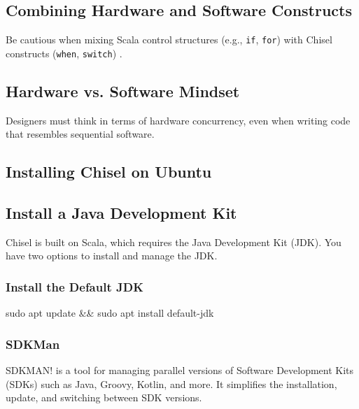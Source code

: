 \subsection{Combining Hardware and Software Constructs}
Be cautious when mixing Scala control structures (e.g., \texttt{if}, \texttt{for}) with Chisel constructs (\texttt{when}, \texttt{switch}) \cite{chisel-tutorial}.

\subsection{Hardware vs. Software Mindset}
Designers must think in terms of hardware concurrency, even when writing code that resembles sequential software.

\subsection{Installing Chisel on Ubuntu}
\subsection{Install a Java Development Kit}
Chisel is built on Scala, which requires the Java Development Kit (JDK). You have two options to install and manage the JDK.

\subsubsection{Install the Default JDK}
\begin{bashcode}
sudo apt update && sudo apt install default-jdk
\end{bashcode}

\subsubsection{SDKMan}

SDKMAN! is a tool for managing parallel versions of Software Development Kits (SDKs) such as Java, Groovy, Kotlin, and more. It simplifies the installation, update, and switching between SDK versions.

